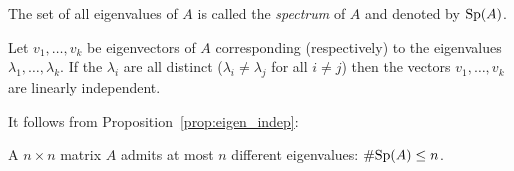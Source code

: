 \documentclass[11pt,nocut]{article}
\begin{document}
\begin{definition}
	The set of all eigenvalues of $A$ is called the \emph{spectrum} of $A$ and denoted by ${{\rm Sp}}(A)$.
\end{definition}

\begin{proposition}\label{prop:eigen_indep}
	Let $v_1, \dots, v_k$ be eigenvectors of $A$ corresponding (respectively) to the eigenvalues $\lambda_1, \dots, \lambda_k$.
	If the $\lambda_i$ are all distinct ($\lambda_i \neq \lambda_j$ for all $i \neq j$) then the vectors $v_1, \dots, v_k$ are linearly independent.
\end{proposition}

It follows from Proposition~\ref{prop:eigen_indep}:

\begin{corollary}
	A $n \times n$ matrix $A$ admits at most $n$ different eigenvalues: $\# {{\rm Sp}}(A) \leq n$.
\end{corollary}





\end{document}
